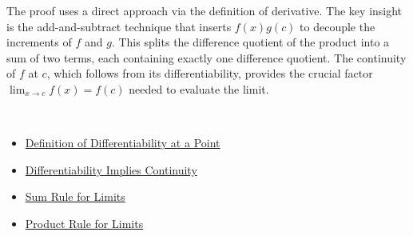 \begin{remark*}
The proof uses a direct approach via the definition of derivative. The key insight is the add-and-subtract technique that inserts $f(x)g(c)$ to decouple the increments of $f$ and $g$. This splits the difference quotient of the product into a sum of two terms, each containing exactly one difference quotient. The continuity of $f$ at $c$, which follows from its differentiability, provides the crucial factor $\lim_{x \to c} f(x) = f(c)$ needed to evaluate the limit.
\end{remark*}

\begin{remark*}[Dependencies]~\\
\begin{itemize}
  \item \hyperref[def:derivative-at-point]{Definition of Differentiability at a Point}
  \item \hyperref[thm:diff-implies-cont]{Differentiability Implies Continuity}
  \item \hyperref[thm:limit-sum]{Sum Rule for Limits}
  \item \hyperref[thm:limit-product]{Product Rule for Limits}
\end{itemize}
\end{remark*}